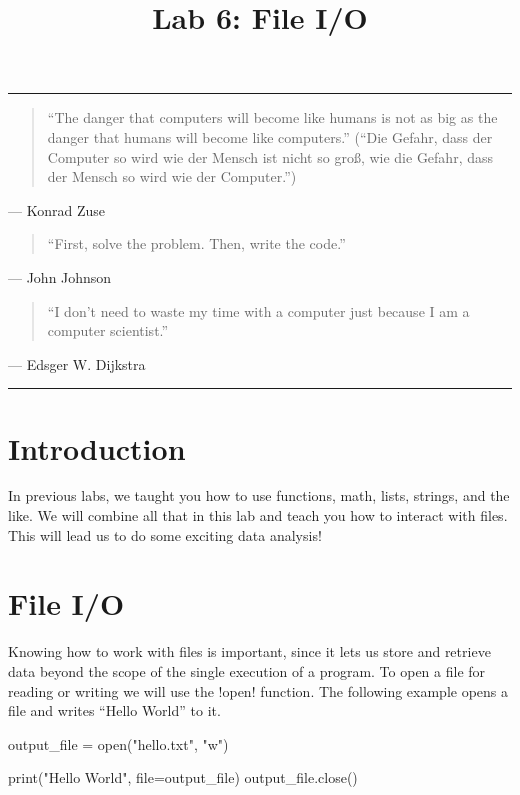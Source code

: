 \documentclass[11pt]{cselabheader}
\title{Lab 6: File I/O}
\begin{document}
\maketitle

\hrule
\begin{quotation}
``The danger that computers will become like humans is not as big as the danger
that humans will become like computers.'' (``Die Gefahr, dass der Computer so
wird wie der Mensch ist nicht so gro\ss, wie die Gefahr, dass der Mensch so wird
wie der Computer.'')
\end{quotation}
\begin{flushright}
--- Konrad Zuse
\end{flushright}

\begin{quotation}
	``First, solve the problem. Then, write the code.''
\end{quotation}
\begin{flushright}
	--- John Johnson
\end{flushright}

\begin{quotation}
``I don’t need to waste my time with a computer just because I am a computer
scientist.''
\end{quotation}
\begin{flushright}
--- Edsger W. Dijkstra
\end{flushright}

\hrule

\section{Introduction}
In previous labs, we taught you how to use functions, math, lists, strings, and
the like. We will combine all that in this lab and teach you how to interact
with files. This will lead us to do some exciting data analysis!

\section{File I/O}
Knowing how to work with files is important, since it lets us store and retrieve
data beyond the scope of the single execution of a program. To open a file for
reading or writing we will use the \pythoninline!open! function. The following
example opens a file and writes ``Hello World'' to it.

\begin{python3code}
output_file = open("hello.txt", "w")

print("Hello World", file=output_file)
output_file.close()
\end{python3code}
\end{document}
